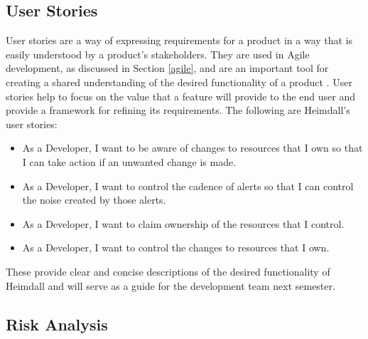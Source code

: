 \documentclass{article}
\begin{document}
\subsection{User Stories}

User stories are a way of expressing requirements for a product in a way that is easily understood by a product's stakeholders. They are used in Agile development, as discussed in Section \ref{agile}, and are an important tool for creating a shared understanding of the desired functionality of a product \cite{user-stories}. User stories help to focus on the value that a feature will provide to the end user and provide a framework for refining its requirements. The following are Heimdall's user stories:

\begin{itemize}
    \itemsep0em
    \item As a Developer, I want to be aware of changes to resources that I own so that I can take action if an unwanted change is made.
    \item As a Developer, I want to control the cadence of alerts so that I can control the noise created by those alerts.
    \item As a Developer, I want to claim ownership of the resources that I control.
    \item As a Developer, I want to control the changes to resources that I own.
\end{itemize}

These provide clear and concise descriptions of the desired functionality of Heimdall and will serve as a guide for the development team next semester.

\subsection{Risk Analysis}
\end{document}
